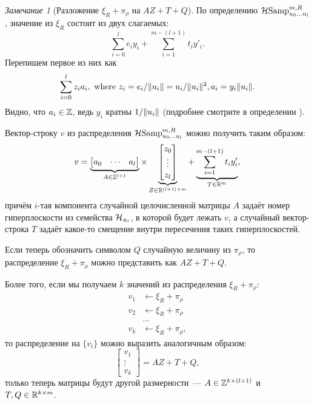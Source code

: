 \documentclass[oneside, a4paper]{article}
\theoremstyle{plain}
\theoremstyle{definition}
\theoremstyle{remark}
\newtheorem{remark}{Замечание}
\newcommand\R{\ensuremath \mathbb R}
\newcommand\Z{\ensuremath \mathbb Z}
\newcommand\HS{\ensuremath \operatorname{\mathcal H Samp}}
\newcommand\HH{\ensuremath \operatorname{\mathcal H}}
\DeclarePairedDelimiter\norm{\lVert}{\rVert}
\begin{document}
\begin{remark}[Разложение $\xi_R + \pi_\rho$ на $AZ + T + Q$]
\label{rem:xi_R}
По определению $\HS^{m,R}_{u_0 \dots u_l}$, значение из $\xi_R$ состоит из двух
слагаемых:
\[
  \sum_{i=0}^l e_i y_i + \sum_{i=1}^{m - (l+1)} t_i y'_i.
\]
Перепишем первое из них как
\[
  \sum_{i=0}^l z_i a_i,
    \text{ where } z_i = e_i / \norm{u_i} = u_i / \norm{u_i}^2, a_i = y_i \norm{u_i}.
\]
Видно, что $a_i \in \Z$, ведь $y_i$ кратны $1/\norm{u_i}$ (подробнее смотрите в
определении ).

Вектор-строку $v$ из распределения $\HS^{m,R}_{u_0 \dots u_l}$ можно получить
таким образом:
\[
  v =
  \underbrace{
    \begin{bmatrix}
    a_0 & \cdots & a_l
    \end{bmatrix}
  }_{A \in \Z^{l+1}}
  \times
  \underbrace{
    \begin{bmatrix}
    z_0 \\ \vdots \\ z_l
    \end{bmatrix}
  }_{Z \in \R^{(l+1) \times m}}
  +
  \underbrace{
    \sum_{i=1}^{m - (l+1)} t_i y'_i
  }_{T \in \R^m},
\]
причём $i$-тая компонента случайной целочисленной матрицы $A$ задаёт номер
гиперплоскости из семейства $\HH_{u_i}$, в которой будет лежать $v$, а случайный
вектор-строка $T$ задаёт какое-то смещение внутри пересечения таких
гиперплоскостей.

Если теперь обозначить символом $Q$ случайную величину из $\pi_\rho$, то
распределение $\xi_R + \pi_\rho$ можно представить как $AZ + T + Q$.

Более того, если мы получаем $k$ значений из распределения $\xi_R + \pi_\rho$:
\[
\begin{aligned}
  v_1 &\gets \xi_R + \pi_\rho \\
  v_2 &\gets \xi_R + \pi_\rho \\
      &\dots \\
  v_k &\gets \xi_R + \pi_\rho,
\end{aligned}
\] то распределение на $\{v_i\}$ можно выразить аналогичным образом:
\[
  \begin{bmatrix}
    v_1 \\ \vdots \\ v_k
  \end{bmatrix}
  = AZ + T + Q,
\]
только теперь матрицы будут другой размерности~---
$A \in \Z^{k \times (l+1)}$ и $T, Q \in \R^{k \times m}$.
\end{remark}
\end{document}
